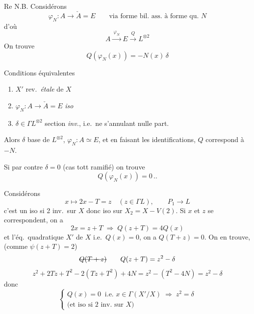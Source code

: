 \documentclass[11pt,a4paper]{article}
\begin{document}
Re N.B. Considérons
\[
  \varphi_{N} : A \longrightarrow \check{A} = E
  \qquad\text{via forme bil.\ ass.\ à forme qu.\ $N$}
\]
d'où
\[
  A \xrightarrow{\ \varphi_{N}\ } E \xrightarrow{\ Q\ } L^{\otimes 2}
\]
On trouve
\[
  \boxed{Q(\varphi_{N}(x)) = - N(x)\,\delta}
\]


Conditions équivalentes
\begin{enumerate}
  \item[a)] $X'$ rev.\ \emph{étale} de $X$
  \item[b)] $\varphi_{N} : A \to \check{A} = E$ \emph{iso}
  \item[c)] $\delta \in \Gamma L^{\otimes 2}$ section \emph{inv.}, i.e.\ ne s'annulant nulle part.
\end{enumerate}
Alors $\delta$ base de $L^{\otimes 2}$, $\varphi_{N} : A \simeq E$, et  en faisant les identifications, $Q$ correspond à $-N$.

Si par contre $\delta = 0$ (cas tott ramifié) on trouve
\[
  Q(\varphi_{N}(x)) = 0 \,..
\]

Considérons
\[
  x \longmapsto \boxed{2x - T = z} \quad (z \in \Gamma L), \qquad P_{1} \longrightarrow L
\]
c'est un iso si 2 inv.\ sur $X$ donc iso sur $X_{2} = X - V(2)$. Si $x$ et $z$ se correspondent, on a
\[
  2x = z + T \;\Longrightarrow\; Q(z + T) = 4Q(x)
\]
et  l'éq.\ quadratique $X'$ de $X$ i.e.\ $Q(x) = 0$, on a $Q(T + z) = 0$. On en trouve,  (comme $\psi(z + T) = 2$)
\[
  \text{\struck{$Q(T+z)$}} \qquad Q(z + T) = z^{2} - \delta
\]
\[
  z^{2} + 2Tz + T^{2} - 2(Tz + T^{2}) + 4N = z^{2} - (T^{2} - 4N) = z^{2} - \delta
\]
donc
\[
  \left\{\begin{array}{l}
    Q(x) = 0 \ \text{ i.e.\ } x \in \Gamma(X'/X) \;\Longrightarrow\; \boxed{z^{2} = \delta}\\
    \text{(et iso si 2 inv.\ sur $X$)}
  \end{array}\right.
\]
\end{document}
